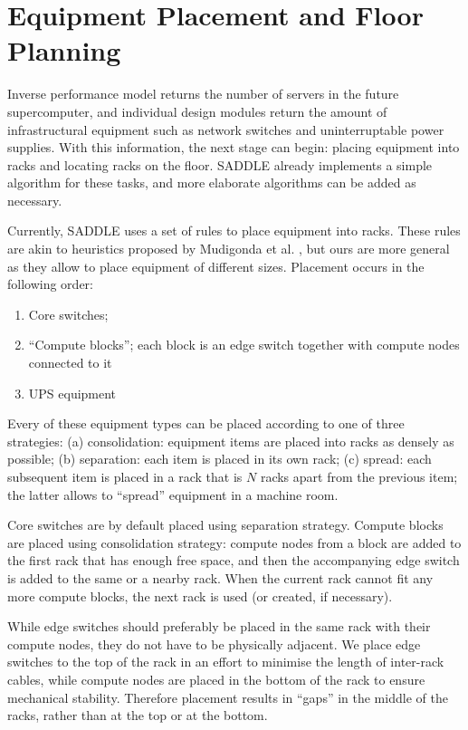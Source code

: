 \documentclass[runningheads,a4paper]{llncs}
\begin{document}
\section{Equipment Placement and Floor Planning}

Inverse performance model returns the number of servers in the future supercomputer, and individual design modules return the amount of infrastructural equipment such as network switches and uninterruptable power supplies. With this information, the next stage can begin: placing equipment into racks and locating racks on the floor. SADDLE already implements a simple algorithm for these tasks, and more elaborate algorithms can be added as necessary.

Currently, SADDLE uses a set of rules to place equipment into racks. These rules are akin to heuristics proposed by Mudigonda et al. \cite{mudigonda2011taming}, but ours are more general as they allow to place equipment of different sizes. Placement occurs in the following order:

\begin{enumerate}
\item Core switches;
\item ``Compute blocks''; each block is an edge switch together with compute nodes connected to it
\item UPS equipment
\end{enumerate}

Every of these equipment types can be placed according to one of three strategies: (a) consolidation: equipment items are placed into racks as densely as possible; (b) separation: each item is placed in its own rack; (c) spread: each subsequent item is placed in a rack that is $N$ racks apart from the previous item; the latter allows to ``spread'' equipment in a machine room.

Core switches are by default placed using separation strategy. Compute blocks are placed using consolidation strategy: compute nodes from a block are added to the first rack that has enough free space, and then the accompanying edge switch is added to the same or a nearby rack. When the current rack cannot fit any more compute blocks, the next rack is used (or created, if necessary).

While edge switches should preferably be placed in the same rack with their compute nodes, they do not have to be physically adjacent. We place edge switches to the top of the rack in an effort to minimise the length of inter-rack cables, while compute nodes are placed in the bottom of the rack to ensure mechanical stability. Therefore placement results in ``gaps'' in the middle of the racks, rather than at the top or at the bottom.
\end{document}
